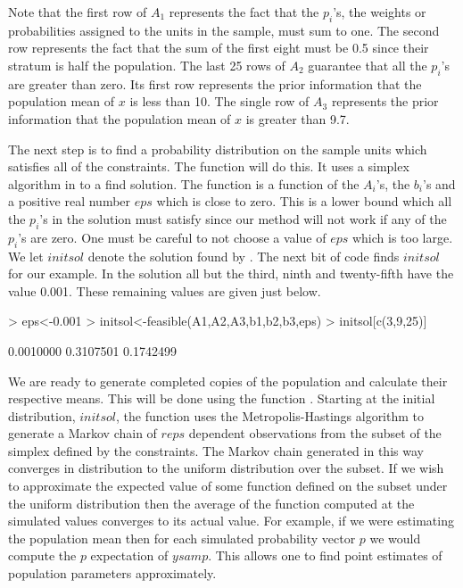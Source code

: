 \documentclass{article}
\begin{document}
Note that the first row of $A_1$ represents the fact that the $p_i$'s,
 the weights or probabilities assigned to the units in the sample,
must sum to one. The second row represents the fact that the 
sum of the first eight must be 0.5 since their stratum is half 
the population. The last 25 rows of $A_2$  guarantee
that all the $p_i$'s are greater than zero. Its first row represents 
the prior information that the population mean of $x$ is less than 10.
The single row of $A_3$ represents the prior information that the 
population mean of $x$ is greater than 9.7.

The next step is to find a probability distribution on the 
sample units which satisfies all of the constraints. The function
\verb@feasible@ will do this. It uses a simplex algorithm in \verb@R@ to 
a find solution. The function \verb@feasible@ is a function of the 
$A_i$'s, the $b_i$'s and a positive real number $eps$ which is 
close to zero. This is a lower bound which all the $p_i$'s 
in the solution must satisfy since our method will not work 
if any of the $p_i$'s are zero. One must be careful to not choose 
a value of $eps$ which is too large. We let $initsol$ denote 
the solution found by \verb@feasible@. The next bit of code finds 
$initsol$ for our example. In the solution all but the 
third, ninth and twenty-fifth have the value 0.001. These 
remaining values are given just below.  

\begin{Schunk}
\begin{Sinput}
> eps<-0.001
> initsol<-feasible(A1,A2,A3,b1,b2,b3,eps)
> initsol[c(3,9,25)]
\end{Sinput}
\begin{Soutput}
[1] 0.0010000 0.3107501 0.1742499
\end{Soutput}
\end{Schunk}

We are ready to generate completed copies of the population and 
calculate their respective means. This will be done using
the function \verb@constrppmn@. 
Starting at the initial distribution, $initsol$, the function 
\verb@constrppmn@ uses the Metropolis-Hastings algorithm  to generate 
a Markov chain of $reps$ dependent observations from the subset of the 
 simplex defined by the constraints.
The Markov chain generated in this way converges in
distribution to the uniform distribution over the subset.
If we wish to approximate the expected
value of some function defined on the subset under the 
uniform distribution then the average
of the function computed at the simulated values converges to its
actual value. For example, if we were estimating the population mean 
then for each simulated probability vector $p$ we would compute 
the $p$ expectation of $ysamp$.
This allows one to find point estimates of
population parameters approximately. 
\end{document}
